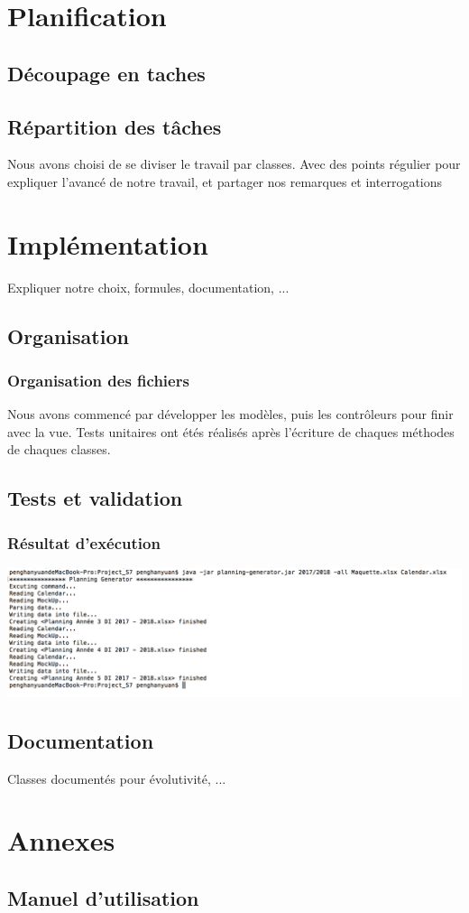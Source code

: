 \documentclass{polytech/polytech}
\begin{document}
	\chapter{Planification}

	\section{Découpage en taches}

	\section{Répartition des tâches}

	Nous avons choisi de se diviser le travail par classes.
	Avec des points régulier pour expliquer l'avancé de notre travail, et partager nos remarques et
	interrogations

	\chapter{Implémentation}

	Expliquer notre choix, formules, documentation, ...

	\section{Organisation}

	\subsection{Organisation des fichiers}

	Nous avons commencé par développer les modèles, puis les contrôleurs pour finir avec la vue.
	Tests unitaires ont étés réalisés après l'écriture de chaques méthodes de chaques classes.

	\section{Tests et validation}
	\subsection{Résultat d'exécution}
	\includegraphics[width=\textwidth]{./img/excution_result.png}
	\section{Documentation}

	Classes documentés pour évolutivité, ...

	\chapter{Annexes}

	\section{Manuel d'utilisation}
	
\end{document}
